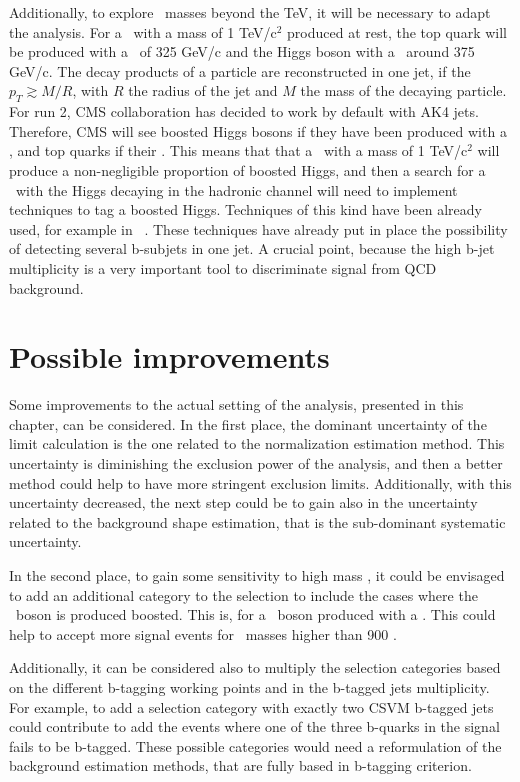 Additionally, to explore \Tp~masses beyond the TeV, it will be necessary to adapt the analysis. For a \Tp~with a mass of 1 TeV/$\text{c}^{2}$ produced at rest, the top quark will be produced with a \pt~of 325 GeV/c and the Higgs boson with a \pt~around 375 GeV/c. The decay products of a particle are reconstructed in one jet, if the $p_{T}\gtrsim M/R$, with $R$ the radius of the jet and $M$ the mass of the decaying particle. For run 2, CMS collaboration has decided to work by default with AK4 jets. Therefore, CMS will see boosted Higgs bosons if they have been produced with a , and top quarks if their . This means that that a \Tp~with a mass of 1 TeV/$\text{c}^{2}$ will produce a non-negligible proportion of boosted Higgs, and then a search for a \Tp~with the Higgs decaying in the hadronic channel will need to implement techniques to tag a boosted Higgs. Techniques of this kind have been already used, for example in~ \cite{Khachatryan:2015axa}. These techniques have already put in place the possibility of detecting several b-subjets in one jet. A crucial point, because the high b-jet multiplicity is a very important tool to discriminate signal from QCD background.

\section{Possible improvements}
\label{sec:impro}

Some improvements to the actual setting of the analysis, presented in this chapter, can be considered. In the first place, the dominant uncertainty of the limit calculation is the one related to the normalization estimation method. This uncertainty is diminishing the exclusion power of the analysis, and then a better method could help to have more stringent exclusion limits. Additionally, with this uncertainty decreased, the next step could be to gain also in the uncertainty related to the background shape estimation, that is the sub-dominant systematic uncertainty.

In the second place, to gain some sensitivity to high mass \Tp, it could be envisaged to add an additional category to the selection to include the cases where the \W~boson is produced boosted. This is, for a \W~boson produced with a . This could help to accept more signal events for \Tp~masses higher than 900 \GeVcc.

Additionally, it can be considered also to multiply the selection categories based on the different b-tagging working points and in the b-tagged jets multiplicity. For example, to add a selection category with exactly two CSVM b-tagged jets could contribute to add the events where one of the three b-quarks in the signal fails to be b-tagged. These possible categories would need a reformulation of the background estimation methods, that are fully based in b-tagging criterion.


